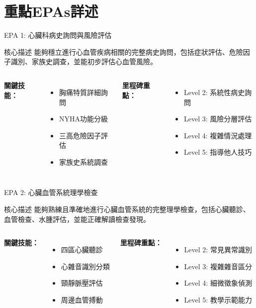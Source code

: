 \documentclass[aspectratio=169]{beamer}
\begin{document}
\section{重點EPAs詳述}

\begin{frame}{EPA 1: 心臟科病史詢問與風險評估}
\begin{alertblock}{核心描述}
能夠穩立進行心血管疾病相關的完整病史詢問，包括症狀評估、危險因子識別、家族史調查，並能初步評估心血管風險。
\end{alertblock}

\begin{columns}[c]
\textbf{關鍵技能：}
\begin{itemize}
\item 胸痛特質詳細詢問
\item NYHA功能分級
\item 三高危險因子評估
\item 家族史系統調查
\end{itemize}

\textbf{里程碑重點：}
\begin{itemize}
\item Level 2: 系統性病史詢問
\item Level 3: 風險分層評估
\item Level 4: 複雜情況處理
\item Level 5: 指導他人技巧
\end{itemize}
\end{columns}
\end{frame}

\begin{frame}{EPA 2: 心臟血管系統理學檢查}
\begin{alertblock}{核心描述}
能夠熟練且準確地進行心臟血管系統的完整理學檢查，包括心臟聽診、血管檢查、水腫評估，並能正確解讀檢查發現。
\end{alertblock}

\begin{columns}[c]
\textbf{關鍵技能：}
\begin{itemize}
\item 四區心臟聽診
\item 心雜音識別分類
\item 頸靜脈壓評估
\item 周邊血管搏動
\end{itemize}

\textbf{里程碑重點：}
\begin{itemize}
\item Level 2: 常見異常識別
\item Level 3: 複雜雜音區分
\item Level 4: 細微徵象偵測
\item Level 5: 教學示範能力
\end{itemize}
\end{columns}
\end{frame}
\end{document}
